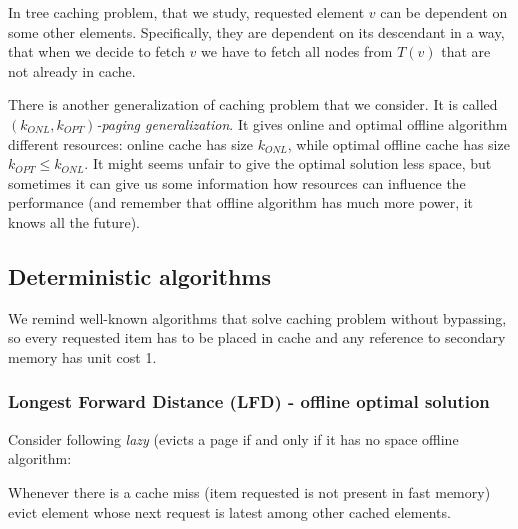 In tree caching problem, that we study, requested element $v$ can be dependent 
on some other elements. Specifically, they are dependent on its descendant in a 
way, that when we decide to fetch $v$ we have to fetch all nodes from $T(v)$ 
that are not already in cache.

There is another generalization of caching problem that we consider. It is 
called $(k_{ONL}, k_{OPT})$\textit{-paging generalization}. It gives online and 
optimal offline algorithm different resources: online cache has size $k_{ONL}$, 
while optimal offline cache has size $k_{OPT} \leq k_{ONL}$. It might seems 
unfair to give the optimal solution less space, but sometimes it can give us 
some information how resources can influence the performance (and remember that 
offline algorithm has much more power, it knows all the future). 

\subsection{Deterministic algorithms}
We remind well-known algorithms that solve caching problem without bypassing, 
so every requested item has to be placed in cache and any reference to 
secondary memory has unit cost 1.
\subsubsection{Longest Forward Distance (LFD) - offline optimal solution}
Consider following \textit{lazy} (evicts a page if and only if it has no space  
offline algorithm: 
\begin{myalgo}
Whenever there is a cache miss (item requested is not 
present in fast memory) evict element whose next request is latest among other 
cached elements.
\end{myalgo}

